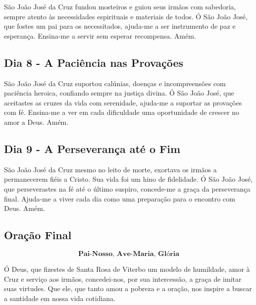 \documentclass[a4paper,14pt]{extarticle} \usepackage[utf8]{inputenc}
\begin{document}
\underline{}

São João José da Cruz fundou mosteiros e guiou seus irmãos com sabedoria, sempre atento às necessidades espirituais e materiais de todos.
Ó São João José, que fostes um pai para os necessitados, ajuda-me a ser instrumento de paz e esperança. Ensina-me a servir sem esperar recompensa. Amém.


\underline{}

\subsection{Dia 8 - A Paciência nas Provações}

\underline{}

São João José da Cruz suportou calúnias, doenças e incompreensões com paciência heroica, confiando sempre na justiça divina.
Ó São João José, que aceitastes as cruzes da vida com serenidade, ajuda-me a suportar as provações com fé. Ensina-me a ver em cada dificuldade uma oportunidade de crescer no amor a Deus. Amém.


\underline{}

\subsection{Dia 9 - A Perseverança até o Fim}

\underline{}

São João José da Cruz mesmo no leito de morte, exortava os irmãos a permanecerem fiéis a Cristo. Sua vida foi um hino de fidelidade.
Ó São João José, que perseverastes na fé até o último suspiro, concede-me a graça da perseverança final. Ajuda-me a viver cada dia como uma preparação para o encontro com Deus. Amém.


\underline{}


\subsection{Oração Final}\label{sub:final} %

\[\textbf{Pai-Nosso, Ave-Maria, Glória}\]

Ó Deus, que fizestes de Santa Rosa de Viterbo um modelo de humildade, amor à Cruz e serviço aos irmãos, concedei-nos, por sua intercessão, a graça de imitar suas virtudes. Que ele, que tanto amou a pobreza e a oração, nos inspire a buscar a santidade em nossa vida cotidiana.
\end{document}
